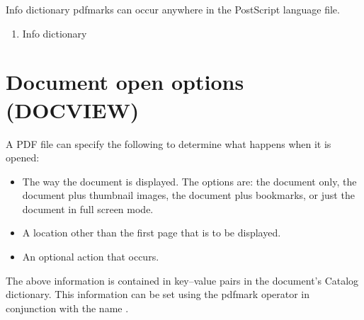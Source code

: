 \documentclass[letterpaper,12pt,english,openany,oneside]{sphinxmanual}
\begin{document}
Info dictionary pdfmarks can occur anywhere in the PostScript language file.
\begin{enumerate}
%
\item {} 
Info dictionary

\end{enumerate}

\begin{sphinxVerbatim}[commandchars=\\\{\}]
\PYG{p}{[}    
      
      
       
      
     
       
     
\end{sphinxVerbatim}


\section{Document open options (DOCVIEW)}
\label{\detokenize{pdfmark_Basic:document-open-options-docview}}
A PDF file can specify the following to determine what happens when it is opened:
\begin{itemize}
\item {} 
The way the document is displayed. The options are: the document only, the document plus thumbnail images, the document plus bookmarks, or just the document in full screen mode.

\item {} 
A location other than the first page that is to be displayed.

\item {} 
An optional action that occurs.

\end{itemize}

The above information is contained in key–value pairs in the document’s Catalog dictionary. This information can be set using the pdfmark operator in conjunction with the name  .
\end{document}
